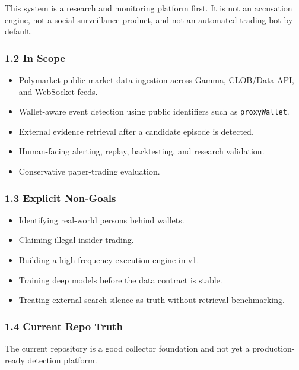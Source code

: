 \documentclass[
]{article}
\providecommand{\tightlist}{%
  \setlength{\itemsep}{0pt}\setlength{\parskip}{0pt}}
\begin{document}
This system is a research and monitoring platform first. It is not an
accusation engine, not a social surveillance product, and not an
automated trading bot by default.

\subsubsection{1.2 In Scope}\label{12-in-scope}

\begin{itemize}
\tightlist
\item
  Polymarket public market-data ingestion across Gamma, CLOB/Data API,
  and WebSocket feeds.
\item
  Wallet-aware event detection using public identifiers such as
  \texttt{proxyWallet}.
\item
  External evidence retrieval after a candidate episode is detected.
\item
  Human-facing alerting, replay, backtesting, and research validation.
\item
  Conservative paper-trading evaluation.
\end{itemize}

\subsubsection{1.3 Explicit Non-Goals}\label{13-explicit-non-goals}

\begin{itemize}
\tightlist
\item
  Identifying real-world persons behind wallets.
\item
  Claiming illegal insider trading.
\item
  Building a high-frequency execution engine in v1.
\item
  Training deep models before the data contract is stable.
\item
  Treating external search silence as truth without retrieval
  benchmarking.
\end{itemize}

\subsubsection{1.4 Current Repo Truth}\label{14-current-repo-truth}

The current repository is a good collector foundation and not yet a
production-ready detection platform.
\end{document}
